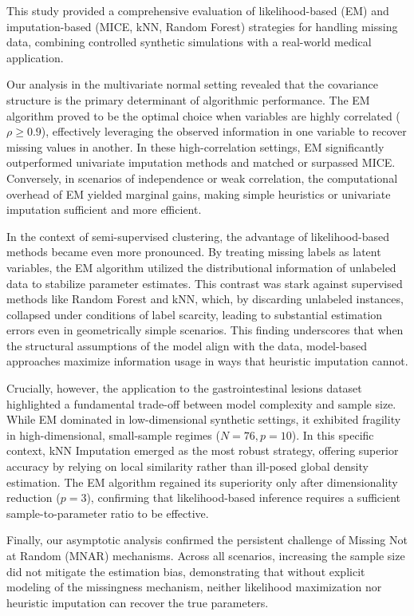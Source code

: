 \documentclass[11pt, a4paper]{article}
\begin{document}
This study provided a comprehensive evaluation of likelihood-based (EM) and imputation-based (MICE, kNN, Random Forest) strategies for handling missing data, combining controlled synthetic simulations with a real-world medical application.

Our analysis in the multivariate normal setting revealed that the covariance structure is the primary determinant of algorithmic performance. The EM algorithm proved to be the optimal choice when variables are highly correlated ($\rho \geq 0.9$), effectively leveraging the observed information in one variable to recover missing values in another. In these high-correlation settings, EM significantly outperformed univariate imputation methods and matched or surpassed MICE. Conversely, in scenarios of independence or weak correlation, the computational overhead of EM yielded marginal gains, making simple heuristics or univariate imputation sufficient and more efficient.

In the context of semi-supervised clustering, the advantage of likelihood-based methods became even more pronounced. By treating missing labels as latent variables, the EM algorithm utilized the distributional information of unlabeled data to stabilize parameter estimates. This contrast was stark against supervised methods like Random Forest and kNN, which, by discarding unlabeled instances, collapsed under conditions of label scarcity, leading to substantial estimation errors even in geometrically simple scenarios. This finding underscores that when the structural assumptions of the model align with the data, model-based approaches maximize information usage in ways that heuristic imputation cannot.

Crucially, however, the application to the gastrointestinal lesions dataset highlighted a fundamental trade-off between model complexity and sample size. While EM dominated in low-dimensional synthetic settings, it exhibited fragility in high-dimensional, small-sample regimes ($N=76, p=10$). In this specific context, kNN Imputation emerged as the most robust strategy, offering superior accuracy by relying on local similarity rather than ill-posed global density estimation. The EM algorithm regained its superiority only after dimensionality reduction ($p=3$), confirming that likelihood-based inference requires a sufficient sample-to-parameter ratio to be effective.

Finally, our asymptotic analysis confirmed the persistent challenge of Missing Not at Random (MNAR) mechanisms. Across all scenarios, increasing the sample size did not mitigate the estimation bias, demonstrating that without explicit modeling of the missingness mechanism, neither likelihood maximization nor heuristic imputation can recover the true parameters.
\end{document}
